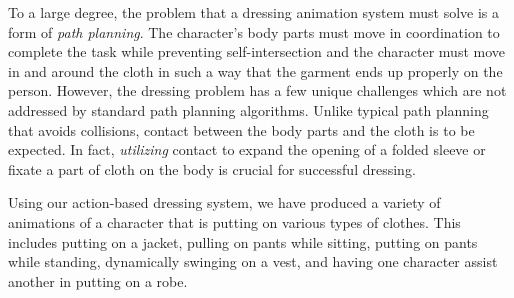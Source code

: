 To a large degree, the problem that a dressing animation system must solve
is a form of \emph{path planning}. The character's body parts must move in coordination to
complete the task while preventing self-intersection and the
character must move in and around the cloth in such a way that the garment
ends up properly on the person. However, the dressing problem has a
few unique challenges which are not addressed by standard path planning
algorithms. Unlike typical path planning that avoids
collisions, contact between the body parts and the cloth is to be
expected. In fact, \emph{utilizing} contact to expand the opening of a folded
sleeve or fixate a part of cloth on the body is crucial for
successful dressing.


Using our action-based dressing system, we have produced a variety of
animations of a character that is putting on various types of clothes.
This includes putting on a jacket, pulling on pants while sitting, putting
on pants while standing, dynamically swinging on a vest, and having one character assist another in putting on a robe.



